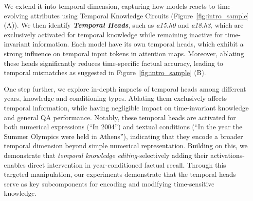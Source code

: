 We extend it into temporal dimension, capturing how models reacts to time-evolving attributes using Temporal Knowledge Circuits (Figure~\ref{fig:intro_sample} (A)).
We then identify \textbf{\textit{Temporal Heads}}, such as \textit{a15.h0} and \textit{a18.h3}, which are exclusively activated for temporal knowledge while remaining inactive for time-invariant information.
Each model have its own temporal heads, which exhibit a strong influence on temporal input tokens in attention maps.
Moreover, ablating these heads significantly reduces time-specific factual accuracy, leading to temporal mismatches as suggested in Figure~\ref{fig:intro_sample} (B).

One step further, we explore in-depth impacts of temporal heads among different years, knowledge and conditioning types.
Ablating them exclusively affects temporal information, while having negligible impact on time-invariant knowledge and general QA performance.
Notably, these temporal heads are activated for both numerical expressions (“In 2004”) and textual conditions (“In the year the Summer Olympics were held in Athens”), indicating that they encode a broader temporal dimension beyond simple numerical representation.
Building on this, we demonstrate that \textit{temporal knowledge editing}-selectively adding their activations-enables direct intervention in year-conditioned factual recall.
Through this targeted manipulation, our experiments demonstrate that the temporal heads serve as key subcomponents for encoding and modifying time-sensitive knowledge.
